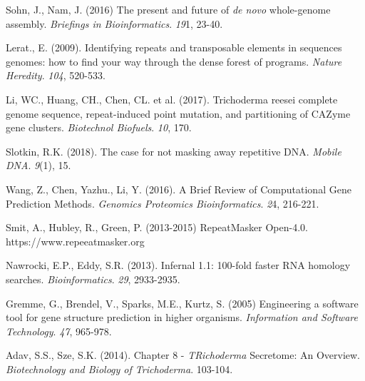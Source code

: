 \documentclass[12pt]{article}
\begin{document}
\begin{thebibliography}{99}
 Sohn, J., Nam, J. (2016) The present and future of
  \textit{de novo} whole-genome assembly. \textit{Briefings in
    Bioinformatics}. \textit{19}1, 23-40.

 Lerat., E. (2009). Identifying repeats and
  transposable elements in sequences genomes: how to find your way
  through the dense forest of programs. \textit{Nature
    Heredity}. \textit{104}, 520-533.

 Li, WC., Huang, CH., Chen, CL. et
  al. (2017). Trichoderma reesei complete genome sequence,
  repeat-induced point mutation, and partitioning of CAZyme gene
  clusters. \textit{Biotechnol Biofuels}. \textit{10}, 170.

 Slotkin, R.K. (2018). The case for not masking away
  repetitive DNA. \textit{Mobile DNA}. \textit{9}(1), 15.
  
 Wang, Z., Chen, Yazhu., Li, Y. (2016). A Brief
  Review of Computational Gene Prediction Methods. \textit{Genomics
    Proteomics Bioinformatics}. \textit{2}4, 216-221.

 Smit, A., Hubley, R., Green, P. (2013-2015)
  RepeatMasker Open-4.0. https://www.repeeatmasker.org

 Nawrocki, E.P., Eddy, S.R. (2013). Infernal 1.1:
  100-fold faster RNA homology
  searches. \textit{Bioinformatics}. \textit{29}, 2933-2935.

 Gremme, G., Brendel, V., Sparks, M.E., Kurtz,
  S. (2005) Engineering a software tool for gene structure prediction
  in higher organisms. \textit{Information and Software
    Technology}. \textit{47}, 965-978.

 Adav, S.S., Sze, S.K. (2014). Chapter 8 -
  \textit{TRichoderma} Secretome: An Overview. \textit{Biotechnology
    and Biology of Trichoderma}. 103-104. 
  
\end{thebibliography}
\end{document}
